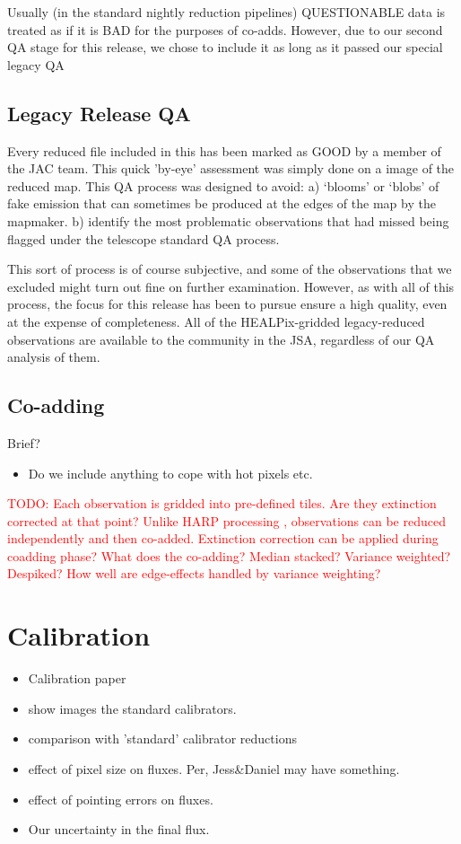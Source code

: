 \documentclass[usenatbib]{mn2e}
\newcommand{\todo}[1]{\textcolor{red}{TODO: #1}}
\begin{document}
Usually (in the standard nightly reduction pipelines) QUESTIONABLE
data is treated as if it is BAD for the purposes of co-adds. However,
due to our second QA stage for this release, we chose to include it as
long as it passed our special legacy QA

\subsection{Legacy Release QA}

Every reduced file included in this has been marked as GOOD by a
member of the JAC team. This quick 'by-eye' assessment was simply done
on a image of the reduced map. This QA process was designed to avoid:
a) `blooms' or `blobs' of fake emission that can sometimes be produced
at the edges of the map by the mapmaker.  b) identify the most
problematic observations that had missed being flagged under the
telescope standard QA process.

This sort of process is of course subjective, and some of the
observations that we excluded might turn out fine on further
examination. However, as with all of this process, the focus for this
release has been to pursue ensure a high quality, even at the expense
of completeness. All of the HEALPix-gridded legacy-reduced
observations are available to the community in the JSA, regardless of
our QA analysis of them.




\subsection{Co-adding}
Brief?
\begin{itemize}
\item Do we include anything to cope with hot pixels etc.
\end{itemize}

\todo{Each observation is gridded into pre-defined tiles. Are they
  extinction corrected at that point? Unlike HARP processing
  \citep{2015ACSISDR}, observations can be reduced independently and
  then co-added. Extinction correction can be applied during coadding
  phase? What does the co-adding? Median stacked? Variance weighted?
  Despiked? How well are edge-effects handled by variance weighting?}


\section{Calibration}
\begin{itemize}
\item Calibration paper \citep{Dempsey2013}
\item show images the standard calibrators.
\item comparison with 'standard' calibrator reductions
\item effect of pixel size on fluxes. Per, Jess\&Daniel may have something.
\item effect of pointing errors on fluxes.
\item Our uncertainty in the final flux.
\end{itemize}
\end{document}
